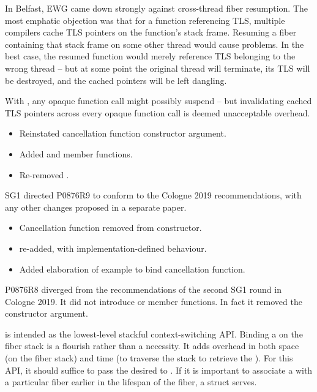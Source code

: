 In Belfast, EWG came down strongly against cross-thread fiber resumption. The
most emphatic objection was that for a function referencing TLS, multiple
compilers cache TLS pointers on the function's stack frame. Resuming a fiber
containing that stack frame on some other thread would cause problems. In the
best case, the resumed function would merely reference TLS belonging to the
wrong thread -- but at some point the original thread will terminate, its TLS
will be destroyed, and the cached pointers will be left dangling.

With \fiber, any opaque function call might possibly suspend -- but
invalidating cached TLS pointers across every opaque function call is deemed
unacceptable overhead.


\begin{itemize}
    \item Reinstated cancellation function constructor argument.
    \item Added  and  member
          functions.
    \item Re-removed \unwindfib.
\end{itemize}

SG1 directed P0876R9 to conform to the Cologne 2019 recommendations, with any
other changes proposed in a separate paper.


\begin{itemize}
    \item Cancellation function removed from \fiber constructor.
    \item \unwindfib re-added, with implementation-defined behaviour.
    \item Added elaboration of  example to bind cancellation
          function.
\end{itemize}

P0876R8 diverged from the recommendations of the second SG1 round in Cologne
2019. It did not introduce  or 
member functions. In fact it removed the \cancelfn constructor argument.

\fiber is intended as the lowest-level stackful context-switching API. Binding
a \cancelfn on the fiber stack is a flourish rather than a necessity. It adds
overhead in both space (on the fiber stack) and time (to traverse the stack to
retrieve the \cancelfn). For this API, it should suffice to pass the desired
\cancelfn to \anyresumewith. If it is important to associate a \cancelfn with
a particular fiber earlier in the lifespan of the fiber, a struct serves.

